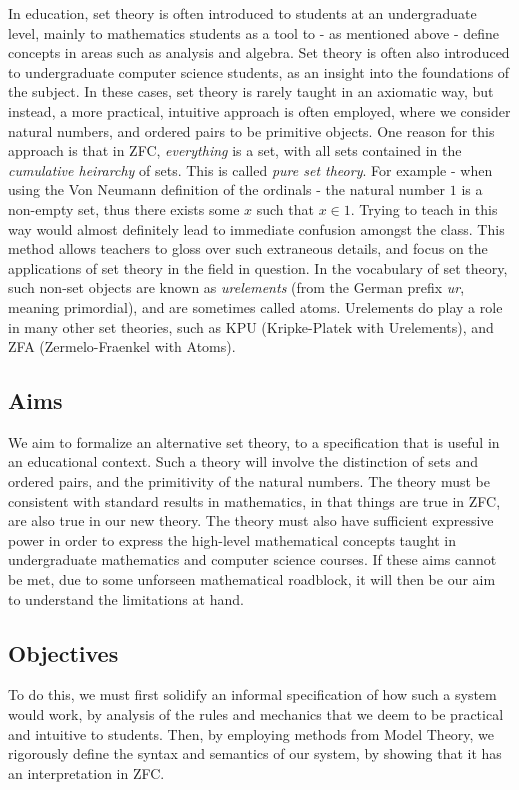 \documentclass[12pt]{article}
\theoremstyle{definition}
\begin{document}
In education, set theory is often introduced to students at an undergraduate level, mainly to mathematics students as a tool to - as mentioned above - define concepts in areas such as analysis and algebra.
Set theory is often also introduced to undergraduate computer science students, as an insight into the foundations of the subject.
In these cases, set theory is rarely taught in an axiomatic way, but instead, a more practical, intuitive approach is often employed, where we consider natural numbers, and ordered pairs to be primitive objects.
One reason for this approach is that in ZFC, \emph{everything} is a set, with all sets contained in the \emph{cumulative heirarchy} of sets.
This is called \emph{pure set theory}.
For example - when using the Von Neumann definition of the ordinals - the natural number $1$ is a non-empty set, thus there exists some $x$ such that $x\in 1$.
Trying to teach in this way would almost definitely lead to immediate confusion amongst the class.
This method allows teachers to gloss over such extraneous details, and focus on the applications of set theory in the field in question.
In the vocabulary of set theory, such non-set objects are known as \emph{urelements} (from the German prefix \emph{ur}, meaning primordial), and are sometimes called atoms.
Urelements do play a role in many other set theories, such as KPU (Kripke-Platek with Urelements), and ZFA (Zermelo-Fraenkel with Atoms).

\subsection{Aims}
We aim to formalize an alternative set theory, to a specification that is useful in an educational context.
Such a theory will involve the distinction of sets and ordered pairs, and the primitivity of the natural numbers.
The theory must be consistent with standard results in mathematics, in that things are true in ZFC, are also true in our new theory.
The theory must also have sufficient expressive power in order to express the high-level mathematical concepts taught in undergraduate mathematics and computer science courses.
If these aims cannot be met, due to some unforseen mathematical roadblock, it will then be our aim to understand the limitations at hand.
\subsection{Objectives}
To do this, we must first solidify an informal specification of how such a system would work, by analysis of the rules and mechanics that we deem to be practical and intuitive to students.
Then, by employing methods from Model Theory, we rigorously define the syntax and semantics of our system, by showing that it has an interpretation in ZFC.
\end{document}
